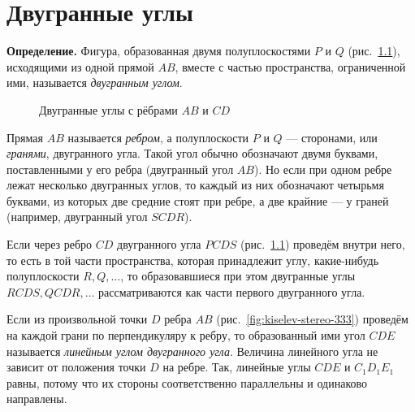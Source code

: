 \chapter{Двугранные углы}\label{ch:ch4}

\begingroup
\setlength{\intextsep}{10pt plus 2pt minus 2pt}
\setlength{\textfloatsep}{12pt plus 2pt minus 2pt}

\newcommand*{\kiselevPlanimetryPage}[2]{%
    \href{https://commons.wikimedia.org/wiki/File:\%D0\%90._\%D0\%9F._\%D0\%9A\%D0\%B8\%D1\%81\%D0\%B5\%D0\%BB\%D1\%91\%D0\%B2._\%D0\%AD\%D0\%BB\%D0\%B5\%D0\%BC\%D0\%B5\%D0\%BD\%D1\%82\%D0\%B0\%D1\%80\%D0\%BD\%D0\%B0\%D1\%8F_\%D0\%B3\%D0\%B5\%D0\%BE\%D0\%BC\%D0\%B5\%D1\%82\%D1\%80\%D0\%B8\%D1\%8F_(1914).djvu?page=#1}{#2}%
}

 \textbf{Определение.} Фигура, образованная двумя полуплоскостями \(P\) и \(Q\) (рис.~\ref{fig:kiselev-stereo-332}), исходящими из одной прямой \(AB\), вместе с частью пространства, ограниченной ими, называется \emph{двугранным углом}.

\begin{figure}[htbp]
    \centering
    \renewcommand{\thefigure}{332}
    \captionsetup{name=Рис.,labelsep=period}
    
    \caption{Двугранные углы с рёбрами \(AB\) и \(CD\)}\label{fig:kiselev-stereo-332}
\end{figure}

Прямая \(AB\) называется \emph{ребром}, а полуплоскости \(P\) и \(Q\) --- сторонами, или \emph{гранями}, двугранного угла. Такой угол обычно обозначают двумя буквами, поставленными у его ребра (двугранный угол \(AB\)).
Но если при одном ребре лежат несколько двугранных углов, то каждый из них обозначают четырьмя буквами, из которых две средние стоят при ребре, а две крайние --- у граней (например, двугранный угол \(SCDR\)).

Если через ребро \(CD\) двугранного угла \(PCDS\) (рис.~\ref{fig:kiselev-stereo-332}) проведём внутри него, то есть в той части пространства, которая принадлежит углу, какие-нибудь полуплоскости \(R,Q,\ldots\), то образовавшиеся при этом двугранные углы \(RCDS,QCDR,\ldots\) рассматриваются как части первого двугранного угла.

Если из произвольной точки \(D\) ребра \(AB\) (рис.~\ref{fig:kiselev-stereo-333}) проведём на каждой грани по перпендикуляру к ребру, то образованный ими угол \(CDE\) называется \emph{линейным углом двугранного угла}. Величина линейного угла не зависит от положения точки \(D\) на ребре. Так, линейные углы \(CDE\) и \(C_1D_1E_1\) равны, потому что их стороны соответственно параллельны и одинаково направлены.

